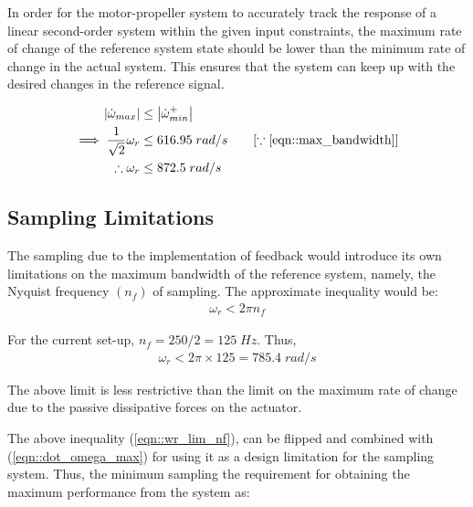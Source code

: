 
In order for the motor-propeller system to accurately track the response of a linear second-order system within the given input constraints, the maximum rate of change of the reference system state should be lower than the minimum rate of change in the actual system. This ensures that the system can keep up with the desired changes in the reference signal.

\begin{align}
    \left\lvert \dot \omega_{max} \right\rvert &\leq \left\lvert \dot \omega^{+}_{min} \right\rvert \label{eqn::dot_omega_max}\\
    \implies \frac{1}{\sqrt{2}} \omega_r &\leq 616.95 \; rad/s
    \qquad [\because \ref{eqn::max_bandwidth}]\\
    \therefore \omega_r &\leq  872.5 \; rad/s
    \label{eqn::omega_r_lim}
\end{align}


\subsection{Sampling Limitations}
The sampling due to the implementation of feedback would introduce its own
limitations on the maximum bandwidth of the reference system, namely, the
Nyquist frequency $(n_f)$ of sampling. The approximate inequality would be:
\begin{align}
    \omega_r < 2 \pi n_f
    \label{eqn::wr_lim_nf}
\end{align}

For the current set-up, $n_f = 250/2 = 125 \; Hz$. Thus,
\begin{align}
    \omega_r < 2\pi \times 125 = 785.4 \; rad/s
\end{align}

The above limit is less restrictive than the limit on the maximum rate of change
due to the passive dissipative forces on the actuator.


\bigskip {} The above inequality (\ref{eqn::wr_lim_nf}), can be
flipped and combined with (\ref{eqn::dot_omega_max}) for using it as a design
limitation for the sampling system. Thus, the minimum sampling the requirement
for obtaining the maximum performance from the system as:

